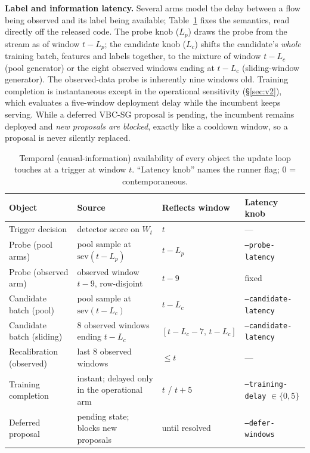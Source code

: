 \documentclass[journal]{IEEEtran}
\begin{document}
\textbf{Label and information latency.} Several arms model the delay between a flow being observed and its label being available; Table~\ref{tab:latency} fixes the semantics, read directly off the released code. The probe knob ($L_p$) draws the probe from the stream as of window $t-L_p$; the candidate knob ($L_c$) shifts the candidate's \emph{whole} training batch, features and labels together, to the mixture of window $t-L_c$ (pool generator) or the eight observed windows ending at $t-L_c$ (sliding-window generator). The observed-data probe is inherently nine windows old. Training completion is instantaneous except in the operational sensitivity (\S\ref{sec:v2}), which evaluates a five-window deployment delay while the incumbent keeps serving. While a deferred VBC-SG proposal is pending, the incumbent remains deployed and \emph{new proposals are blocked}, exactly like a cooldown window, so a proposal is never silently replaced.

\begin{table}[t]
\centering
\caption{Temporal (causal-information) availability of every object the update loop touches at a trigger at window $t$. ``Latency knob'' names the runner flag; 0 = contemporaneous.}
\label{tab:latency}
\footnotesize
\setlength{\tabcolsep}{3.5pt}
\begin{tabular}{l l l l}
\toprule
Object & Source & Reflects window & Latency knob \\
\midrule
Trigger decision & detector score on $W_t$ & $t$ & --- \\
Probe (pool arms) & pool sample at $\mathrm{sev}(t-L_p)$ & $t-L_p$ & \texttt{--probe-latency} \\
Probe (observed arm) & observed window $t-9$, row-disjoint & $t-9$ & fixed \\
Candidate batch (pool) & pool sample at $\mathrm{sev}(t-L_c)$ & $t-L_c$ & \texttt{--candidate-latency} \\
Candidate batch (sliding) & 8 observed windows ending $t-L_c$ & $[t-L_c-7,\, t-L_c]$ & \texttt{--candidate-latency} \\
Recalibration (observed) & last 8 observed windows & $\le t$ & --- \\
Training completion & instant; delayed only in the operational arm & $t$ / $t{+}5$ & \texttt{--training-delay} $\in\{0,5\}$ \\
Deferred proposal & pending state; blocks new proposals & until resolved & \texttt{--defer-windows} \\
\bottomrule
\end{tabular}
\end{table}
\end{document}
